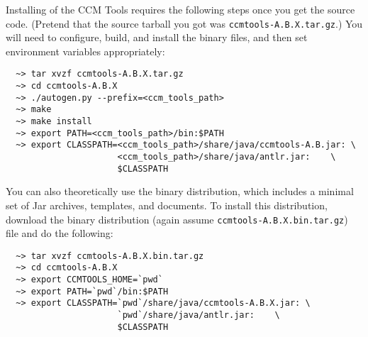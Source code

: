 Installing of the CCM Tools requires the following steps once you get the source
code. (Pretend that the source tarball you got was {\tt ccmtools-A.B.X.tar.gz}.)
You will need to configure, build, and install the binary files, and then set
environment variables appropriately:
\begin{small}
\begin{verbatim}
  ~> tar xvzf ccmtools-A.B.X.tar.gz
  ~> cd ccmtools-A.B.X
  ~> ./autogen.py --prefix=<ccm_tools_path>
  ~> make
  ~> make install
  ~> export PATH=<ccm_tools_path>/bin:$PATH
  ~> export CLASSPATH=<ccm_tools_path>/share/java/ccmtools-A.B.jar: \
                      <ccm_tools_path>/share/java/antlr.jar:    \
                      $CLASSPATH
\end{verbatim}
\end{small}

You can also theoretically use the binary distribution, which includes a minimal
set of Jar archives, templates, and documents. To install this distribution,
download the binary distribution (again assume {\tt ccmtools-A.B.X.bin.tar.gz})
file and do the following:
\begin{small}
\begin{verbatim}
  ~> tar xvzf ccmtools-A.B.X.bin.tar.gz
  ~> cd ccmtools-A.B.X
  ~> export CCMTOOLS_HOME=`pwd`
  ~> export PATH=`pwd`/bin:$PATH
  ~> export CLASSPATH=`pwd`/share/java/ccmtools-A.B.X.jar: \
                      `pwd`/share/java/antlr.jar:    \
                      $CLASSPATH
\end{verbatim}
\end{small}

